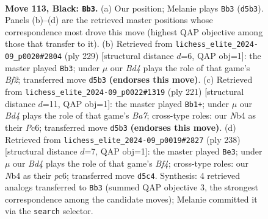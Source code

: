 \documentclass[11pt]{article}
\begin{document}
\clearpage

\begin{figure}[p]\centering
\begin{subfigure}{0.46\textwidth}\centering
\resizebox{\linewidth}{!}{%
\newchessgame
\chessboard[
  setfen={8/8/8/3b3k/1n1B4/8/5P1K/8 b - - 72 113},
  showmover=false,
  pgfstyle=straightmove, color=movearrow, markmove={d5-b3}
]}
\caption{}
\end{subfigure}\hfill
\begin{subfigure}{0.46\textwidth}\centering
\resizebox{\linewidth}{!}{%
\newchessgame
\chessboard[
  setfen={8/3K1b2/5P2/8/5k2/2B5/8/8 b - - 44 115},
  showmover=false,
  pgfstyle=straightmove, color=movearrow, markmove={f7-b3}
]}
\caption{}
\end{subfigure}
\\[4pt]
\begin{subfigure}{0.46\textwidth}\centering
\resizebox{\linewidth}{!}{%
\newchessgame
\chessboard[
  setfen={4k3/8/2p2P2/2P5/4K3/2B5/b7/8 b - - 32 111},
  showmover=false,
  pgfstyle=straightmove, color=movearrow, markmove={a2-b1}
]}
\caption{}
\end{subfigure}\hfill
\begin{subfigure}{0.46\textwidth}\centering
\resizebox{\linewidth}{!}{%
\newchessgame
\chessboard[
  setfen={8/7k/2p2K2/8/2b2B2/3p4/8/8 w - - 0 120},
  showmover=false,
  pgfstyle=straightmove, color=movearrow, markmove={f4-e3}
]}
\caption{}
\end{subfigure}
\caption{\textbf{Move 113, Black: \texttt{Bb3}.} (a) Our position; Melanie plays \texttt{Bb3} (\texttt{d5b3}). Panels (b)--(d) are the retrieved master positions whose correspondence most drove this move (highest QAP objective among those that transfer to it). (b) Retrieved from \texttt{lichess\_elite\_2024-09\_p0020\#2804} (ply 229) [structural distance $d$=6, QAP obj=1]: the master played \texttt{Bb3}; under $\mu$ our \emph{Bd4} plays the role of that game's \emph{Bf2}; transferred move \texttt{d5b3} \textbf{(endorses this move)}. (c) Retrieved from \texttt{lichess\_elite\_2024-09\_p0022\#1319} (ply 221) [structural distance $d$=11, QAP obj=1]: the master played \texttt{Bb1+}; under $\mu$ our \emph{Bd4} plays the role of that game's \emph{Ba7}; cross-type roles: our \emph{N}b4 as their \emph{P}c6; transferred move \texttt{d5b3} \textbf{(endorses this move)}. (d) Retrieved from \texttt{lichess\_elite\_2024-09\_p0019\#2827} (ply 238) [structural distance $d$=7, QAP obj=1]: the master played \texttt{Be3}; under $\mu$ our \emph{Bd4} plays the role of that game's \emph{Bf4}; cross-type roles: our \emph{N}b4 as their \emph{p}c6; transferred move \texttt{d5c4}. Synthesis: 4 retrieved analogs transferred to \texttt{Bb3} (summed QAP objective 3, the strongest correspondence among the candidate moves); Melanie committed it via the \texttt{search} selector.}
\label{fig:thought-m225}
\end{figure}
\end{document}

